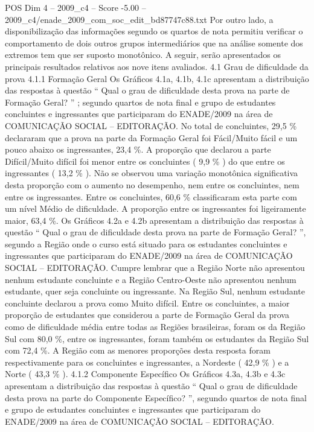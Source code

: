 \begin{textsample}{POS Dim 4 – 2009\_c4 – Score -5.00 – 2009\_c4/enade\_2009\_com\_soc\_edit\_bd87747c88.txt}
Por outro lado, a disponibilização das informações segundo os quartos de nota permitiu verificar o comportamento de dois outros grupos intermediários que na análise somente dos extremos tem que ser suposto monotônico.
A seguir, serão apresentados os principais resultados relativos aos nove itens avaliados. 4.1 Grau de dificuldade da prova 4.1.1 Formação Geral Os Gráficos 4.1a, 4.1b, 4.1c apresentam a distribuição das respostas à questão “ Qual o grau de dificuldade desta prova na parte de Formação Geral? ” ; segundo quartos de nota final e grupo de estudantes concluintes e ingressantes que participaram do ENADE/2009 na área de COMUNICAÇÃO SOCIAL – EDITORAÇÃO.
No total de concluintes, 29,5 \% declararam que a prova na parte da Formação Geral foi Fácil/Muito fácil e um pouco abaixo os ingressantes, 23,4 \%.
A proporção que declarou a parte Difícil/Muito difícil foi menor entre os concluintes ( 9,9 \% ) do que entre os ingressantes ( 13,2 \% ).
Não se observou uma variação monotônica significativa desta proporção com o aumento no desempenho, nem entre os concluintes, nem entre os ingressantes.
Entre os concluintes, 60,6 \% classificaram esta parte com um nível Médio de dificuldade.
A proporção entre os ingressantes foi ligeiramente maior, 63,4 \%.
Os Gráficos 4.2a e 4.2b apresentam a distribuição das respostas à questão “ Qual o grau de dificuldade desta prova na parte de Formação Geral? ”, segundo a Região onde o curso está situado para os estudantes concluintes e ingressantes que participaram do ENADE/2009 na área de COMUNICAÇÃO SOCIAL – EDITORAÇÃO.
Cumpre lembrar que a Região Norte não apresentou nenhum estudante concluinte e a Região Centro-Oeste não apresentou nenhum estudante, quer seja concluinte ou ingressante.
Na Região Sul, nenhum estudante concluinte declarou a prova como Muito difícil.
Entre os concluintes, a maior proporção de estudantes que considerou a parte de Formação Geral da prova como de dificuldade média entre todas as Regiões brasileiras, foram os da Região Sul com 80,0 \%, entre os ingressantes, foram também os estudantes da Região Sul com 72,4 \%.
A Região com as menores proporções desta resposta foram respectivamente para os concluintes e ingressantes, a Nordeste ( 42,9 \% ) e a Norte ( 43,3 \% ). 4.1.2 Componente Específico Os Gráficos 4.3a, 4.3b e 4.3c apresentam a distribuição das respostas à questão “ Qual o grau de dificuldade desta prova na parte do Componente Específico? ”, segundo quartos de nota final e grupo de estudantes concluintes e ingressantes que participaram do ENADE/2009 na área de COMUNICAÇÃO SOCIAL – EDITORAÇÃO.

\end{textsample}
